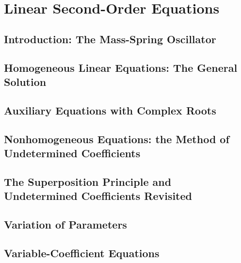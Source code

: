 \documentclass[../diffeq.tex]{subfiles}
\begin{document}
\chapter{Linear Second-Order Equations}
\section{Introduction: The Mass-Spring Oscillator}
\section{Homogeneous Linear Equations: The General Solution}
\section{Auxiliary Equations with Complex Roots}
\section{Nonhomogeneous Equations: the Method of Undetermined Coefficients}
\section{The Superposition Principle and Undetermined Coefficients Revisited}
\section{Variation of Parameters}
\section{Variable-Coefficient Equations}
\end{document}
